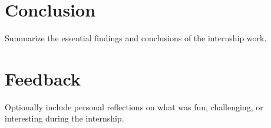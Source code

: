 \section{Conclusion}
Summarize the essential findings and conclusions of the internship work.



\section{Feedback}
Optionally include personal reflections on what was fun, challenging, or
interesting during the internship.
